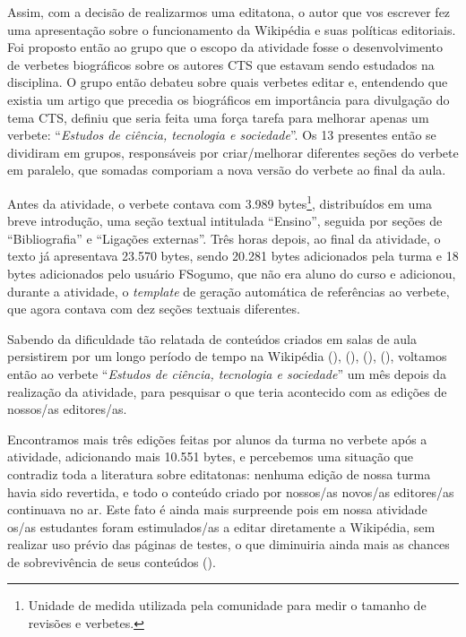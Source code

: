 Assim, com a decisão de realizarmos uma editatona, o autor que vos escrever fez uma apresentação sobre o funcionamento da Wikipédia e suas políticas editoriais. Foi proposto então ao grupo que o escopo da atividade fosse o desenvolvimento de verbetes biográficos sobre os autores CTS que estavam sendo estudados na disciplina. O grupo então debateu sobre quais verbetes editar e, entendendo que existia um artigo que precedia os biográficos em importância para divulgação do tema CTS, definiu que seria feita uma força tarefa para melhorar apenas um verbete: ``\textit{Estudos de ciência, tecnologia e sociedade}''. Os 13 presentes então se dividiram em grupos, responsáveis por criar/melhorar diferentes seções do verbete em paralelo, que somadas comporiam a nova versão do verbete ao final da aula.

Antes da atividade, o verbete contava com 3.989 bytes\footnote{Unidade de medida utilizada pela comunidade para medir o tamanho de revisões e verbetes.}, distribuídos em uma breve introdução, uma seção textual intitulada ``Ensino'', seguida por seções de ``Bibliografia'' e ``Ligações externas''. Três horas depois, ao final da atividade, o texto já apresentava 23.570 bytes, sendo 20.281 bytes adicionados pela turma e 18 bytes adicionados pelo usuário FSogumo, que não era aluno do curso e adicionou, durante a atividade, o \textit{template} de geração automática de referências ao verbete, que agora contava com dez seções textuais diferentes.

Sabendo da dificuldade tão relatada de conteúdos criados em salas de aula persistirem por um longo período de tempo na Wikipédia (\cite{marques_trabalhando_2012}), (\cite{carver_assigning_2012}), (\cite{archuby_experiencias_2018}), (\cite{soler-adillon_wikipedia_2018}), voltamos então ao verbete ``\textit{Estudos de ciência, tecnologia e sociedade}'' um mês depois da realização da atividade, para pesquisar o que teria acontecido com as edições de nossos/as editores/as.

Encontramos mais três edições feitas por alunos da turma no verbete após a atividade, adicionando mais 10.551 bytes, e percebemos uma situação que contradiz toda a literatura sobre editatonas: nenhuma edição de nossa turma havia sido revertida, e todo o conteúdo criado por nossos/as novos/as editores/as continuava no ar. Este fato é ainda mais surpreende pois em nossa atividade os/as estudantes foram estimulados/as a editar diretamente a Wikipédia, sem realizar uso prévio das páginas de testes, o que diminuiria ainda mais as chances de sobrevivência de seus conteúdos (\cite{marques_trabalhando_2012}).

